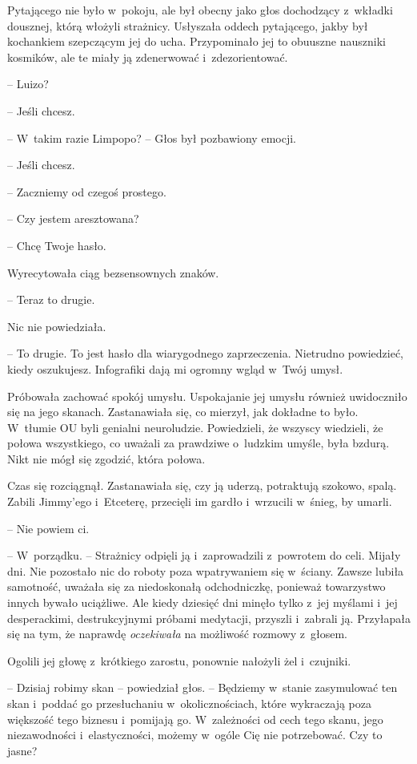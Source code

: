 \documentclass[oneside,polish,11pt,sfheadings]{mwbk}
\begin{document}
Pytającego nie było w~pokoju, ale był obecny jako głos dochodzący z~wkładki dousznej, którą włożyli strażnicy. Usłyszała oddech pytającego,
jakby był kochankiem szepczącym jej do ucha. Przypominało jej to
obuuszne nauszniki kosmików, ale te miały ją zdenerwować i~zdezorientować.

-- Luizo?

-- Jeśli chcesz.

-- W~takim razie Limpopo? -- Głos był pozbawiony emocji.

-- Jeśli chcesz.

-- Zaczniemy od czegoś prostego.

-- Czy jestem aresztowana?

-- Chcę Twoje hasło.

Wyrecytowała ciąg bezsensownych znaków.

-- Teraz to drugie.

Nic nie powiedziała.

-- To drugie. To jest hasło dla wiarygodnego zaprzeczenia. Nietrudno
powiedzieć, kiedy oszukujesz. Infografiki dają mi ogromny wgląd w~Twój
umysł.

Próbowała zachować spokój umysłu. Uspokajanie jej umysłu również
uwidoczniło się na jego skanach. Zastanawiała się, co mierzył, jak
dokładne to było. W~tłumie OU byli genialni neuroludzie. Powiedzieli, że
wszyscy wiedzieli, że połowa wszystkiego, co uważali za prawdziwe o~ludzkim umyśle, była bzdurą. Nikt nie mógł się zgodzić, która połowa.

Czas się rozciągnął. Zastanawiała się, czy ją uderzą, potraktują
szokowo, spalą. Zabili Jimmy'ego i~Etceterę, przecięli im gardło i~wrzucili w~śnieg, by umarli.

-- Nie powiem ci.

-- W~porządku. -- Strażnicy odpięli ją i~zaprowadzili z~powrotem do celi.
Mijały dni. Nie pozostało nic do roboty poza wpatrywaniem się w~ściany.
Zawsze lubiła samotność, uważała się za niedoskonałą odchodniczkę,
ponieważ towarzystwo innych bywało uciążliwe. Ale kiedy dziesięć dni
minęło tylko z~jej myślami i~jej desperackimi, destrukcyjnymi próbami
medytacji, przyszli i~zabrali ją. Przyłapała się na tym, że naprawdę
\textit{oczekiwała} na możliwość rozmowy z~głosem.

Ogolili jej głowę z~krótkiego zarostu, ponownie nałożyli żel i~czujniki.

-- Dzisiaj robimy skan -- powiedział głos. -- Będziemy w~stanie zasymulować
ten skan i~poddać go przesłuchaniu w~okolicznościach, które wykraczają
poza większość tego biznesu i~pomijają go. W~zależności od cech tego
skanu, jego niezawodności i~elastyczności, możemy w~ogóle Cię nie
potrzebować. Czy to jasne?
\end{document}
